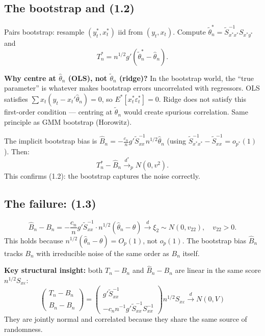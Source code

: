 \documentclass[11pt]{article}
\theoremstyle{definition}
\begin{document}
\subsection{The bootstrap and (1.2)}
 
Pairs bootstrap: resample $(y_t^*, x_t^*)$ iid from $(y_t, x_t)$.
Compute $\tilde\theta_n^* = \tilde S_{x^*x^*}^{-1}S_{x^*y^*}$ and
\[
  T_n^* = n^{1/2}g'(\tilde\theta_n^* - \hat\theta_n).
\]
 
\textbf{Why centre at $\hat\theta_n$ (OLS), not $\tilde\theta_n$ (ridge)?}
In the bootstrap world, the ``true parameter'' is whatever makes
bootstrap errors uncorrelated with regressors. OLS satisfies
$\sum x_t(y_t - x_t'\hat\theta_n) = 0$, so
$E^*[x_t^*\varepsilon_t^*] = 0$. Ridge does not satisfy this first-order
condition --- centring at $\tilde\theta_n$ would create spurious
correlation. Same principle as GMM bootstrap (Horowitz).
 
\medskip
 
The implicit bootstrap bias is
$\hat B_n = -\frac{c_n}{n}g'\tilde S_{xx}^{-1}n^{1/2}\hat\theta_n$
(using $\tilde S_{x^*x^*}^{-1} - \tilde S_{xx}^{-1} = o_{p^*}(1)$).
Then:
\[
  T_n^* - \hat B_n \xrightarrow{d^*}_p N(0, v^2).
\]
This confirms (1.2): the bootstrap captures the noise correctly.
 
\subsection{The failure: (1.3)}
 
\[
  \hat B_n - B_n
  = -\frac{c_n}{n}g'\tilde S_{xx}^{-1} \cdot n^{1/2}(\hat\theta_n - \theta)
  \xrightarrow{d} \xi_2 \sim N(0, v_{22}), \quad v_{22} > 0.
\]
This holds because $n^{1/2}(\hat\theta_n - \theta) = O_p(1)$, not
$o_p(1)$. The bootstrap bias $\hat B_n$ tracks $B_n$ with irreducible
noise of the same order as $B_n$ itself.
 
\medskip
 
\textbf{Key structural insight:} both $T_n - B_n$ and $\hat B_n - B_n$
are linear in the same score $n^{1/2}S_{x\varepsilon}$:
\[
  \begin{pmatrix}T_n - B_n \\ \hat B_n - B_n\end{pmatrix}
  = \begin{pmatrix}g'\tilde S_{xx}^{-1} \\
    -c_n n^{-1}g'\tilde S_{xx}^{-1}S_{xx}^{-1}\end{pmatrix}
  n^{1/2}S_{x\varepsilon}
  \xrightarrow{d} N(0, V)
\]
They are jointly normal and correlated because they share the same
source of randomness.
 
\end{document}
